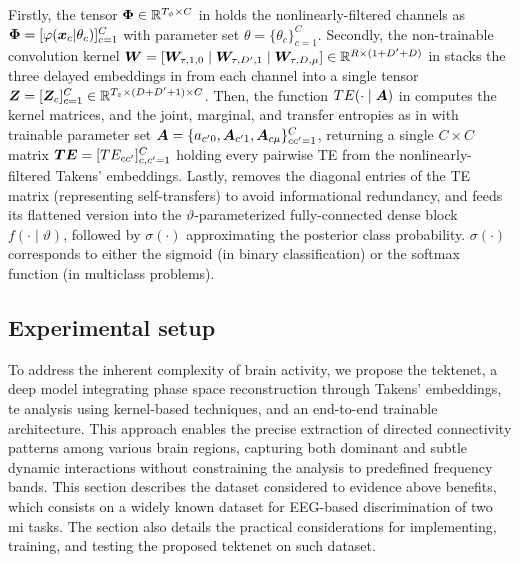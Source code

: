 Firstly, the tensor ${\bm{\Phi}} \in \mathbb{R}^{T_{\phi} \times C}$ in  holds the nonlinearly-filtered channels as ${\bm{\Phi}} = [\varphi({\bm{x}}_c|\theta_c)]_{c=1}^C$ with parameter set $\theta=\{\theta_c\}_{c=1}^C$. Secondly, the non-trainable convolution kernel {${\bm{W}} = [{\bm{W}}_{\tau,1,0} \mid {\bm{W}}_{\tau,D',1} \mid {\bm{W}}_{\tau,D,\mu}] \in \mathbb{R}^{R \times (1 + D' + D)}$} in  stacks the three delayed embeddings in  from each channel into a single tensor ${\bm{Z}} = [{\bm{Z}}_c]_{c=1}^C \in \mathbb{R}^{T_z \times (D+D'+1) \times C}$. Then, the function $TE(\cdot\mid{\bm{A}})$ in  computes the kernel matrices, and the joint, marginal, and transfer entropies as in  with trainable parameter set ${\bm{A}}=\{{a}_{c'0}, {\bm{A}}_{c'1}, {\bm{A}}_{c\mu}\}_{cc'=1}^C$, returning a single $C\times C$ matrix ${\bm{TE}}=[TE_{cc'}]_{c,c'=1}^C$ holding every pairwise TE from the nonlinearly-filtered Takens' embeddings. Lastly,  removes the diagonal entries of the TE matrix (representing self-transfers) to avoid informational redundancy, and feeds its flattened version into the $\vartheta$-parameterized fully-connected dense block $f(\cdot\mid\vartheta)$, followed by $\sigma(\cdot)$ approximating the posterior class probability. $\sigma(\cdot)$ corresponds to either the sigmoid (in binary classification) or the softmax function (in multiclass problems).

\subsection{Experimental setup}\label{sec:Experimental_setup2}

To address the inherent complexity of brain activity, we propose the \gls{tektenet}, a deep model integrating phase space reconstruction through Takens' embeddings, \gls{te} analysis using kernel-based techniques, and an end-to-end trainable architecture. This approach enables the precise extraction of directed connectivity patterns among various brain regions, capturing both dominant and subtle dynamic interactions without constraining the analysis to predefined frequency bands. This section describes the dataset considered to evidence above benefits, which consists on a widely known dataset for EEG-based discrimination of two \gls{mi} tasks. The section also details the practical considerations for implementing, training, and testing the proposed \gls{tektenet} on such dataset.

